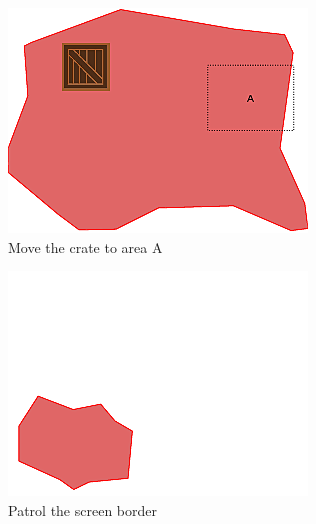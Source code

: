 \documentclass[]{article}
\begin{document}
\begin{figure}
\begin{subfigure}{0.42\textwidth}
		\includegraphics[width=\linewidth]{slide_images/Swarm_Robot_Control_-_Unknown_Number_of_Robots_0029.png}
		\caption{Move the crate to area A}
		\label{fig:sub2}
	\end{subfigure}%
	\begin{subfigure}{0.42\textwidth}
		\centering
		\includegraphics[width=\linewidth]{slide_images/Swarm_Robot_Control_-_Unknown_Number_of_Robots_0031.png}
		\caption{Patrol the screen border}
		\label{fig:sub1}
	\end{subfigure}
	\begin{subfigure}{0.42\textwidth}
		\centering

\end{subfigure}
\end{figure}
\end{document}
